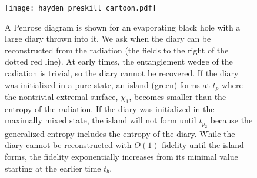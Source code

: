 \documentclass[a4paper,11pt]{article}
\newcommand*{\JKF}[1]{\textcolor{blue}{#1}}
\newcommand{\SV}[1]{\textcolor{red}{#1}}
\begin{document}
\begin{enumerate}
\begin{figure}[]
 \centering
 \texttt{[image: hayden\_preskill\_cartoon.pdf]}
 \caption{A Penrose diagram is shown for an evaporating black hole with a large diary thrown into it. We ask when the diary can be reconstructed from the radiation (the fields to the right of the dotted red line). At early times, the entanglement wedge of the radiation is trivial, so the diary cannot be recovered. If the diary was initialized in a pure state, an island (green) forms at $t_p$ where the nontrivial extremal surface, $\chi_1$, becomes smaller than the entropy of the radiation. If the diary was initialized in the maximally mixed state, the island will not form until $t_{p_2}$ because the generalized entropy includes the entropy of the diary. While the diary cannot be reconstructed with $O(1)$ fidelity until the island forms, the fidelity exponentially increases from its minimal value starting at the earlier time $t_b$. }
 \label{hayden_preskill_cartoon}
\end{figure}




\end{enumerate}
\end{document}
